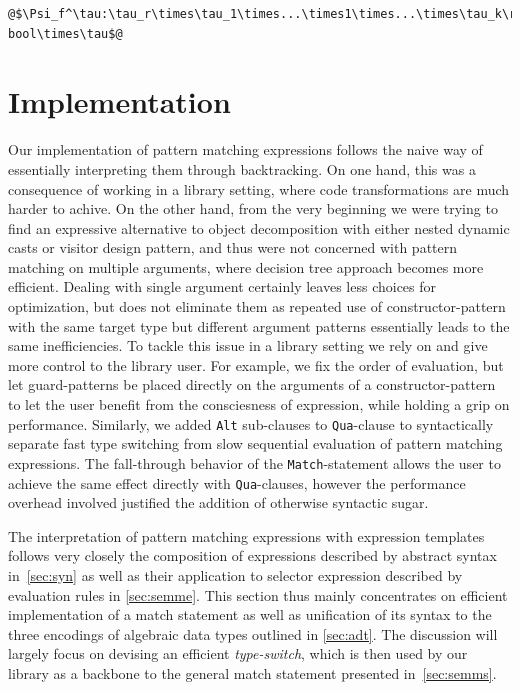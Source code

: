 \documentclass[preprint]{sigplanconf}
\makeatletter
\DeclareRobustCommand{\code}[1]{{\lstinline[breaklines=false,escapechar=@]{#1}}}
\makeatother
\begin{document}
\begin{lstlisting}
@$\Psi_f^\tau:\tau_r\times\tau_1\times...\times1\times...\times\tau_k\rightarrow bool\times\tau$@
\end{lstlisting} 

\section{Implementation} %
\label{sec:impl}

Our implementation of pattern matching expressions follows the naive way of 
essentially interpreting them through backtracking. On one hand, this was a 
consequence of working in a library setting, where code transformations are much 
harder to achive. On the other hand, from the very beginning we were trying to 
find an expressive alternative to object decomposition with either nested 
dynamic casts or visitor design pattern, and thus were not concerned with 
pattern matching on multiple arguments, where decision tree approach becomes 
more efficient. Dealing with single argument certainly leaves less choices for 
optimization, but does not eliminate them as repeated use of constructor-pattern 
with the same target type but different argument patterns essentially leads to 
the same inefficiencies. To tackle this issue in a library setting we rely on 
and give more control to the library user. For example, we fix the order of 
evaluation, but let guard-patterns be placed directly on the arguments of a 
constructor-pattern to let the user benefit from the consciesness of expression, 
while holding a grip on performance. Similarly, we added \code{Alt} sub-clauses 
to \code{Qua}-clause to syntactically separate fast type switching from slow 
sequential evaluation of pattern matching expressions. The fall-through behavior 
of the \code{Match}-statement allows the user to achieve the same effect 
directly with \code{Qua}-clauses, however the performance overhead involved 
justified the addition of otherwise syntactic sugar.

The interpretation of pattern matching expressions with expression templates follows 
very closely the composition of expressions described by abstract syntax 
in~\textsection\ref{sec:syn} as well as their application to selector expression 
described by evaluation rules in \textsection\ref{sec:semme}. This section thus
mainly concentrates on efficient implementation of a match statement as 
well as unification of its syntax to the three encodings of algebraic data types
outlined in \textsection\ref{sec:adt}. The discussion will largely focus on 
devising an efficient \emph{type-switch}, which is then used by our library as a 
backbone to the general match statement presented in~\textsection\ref{sec:semms}. 
\end{document}
